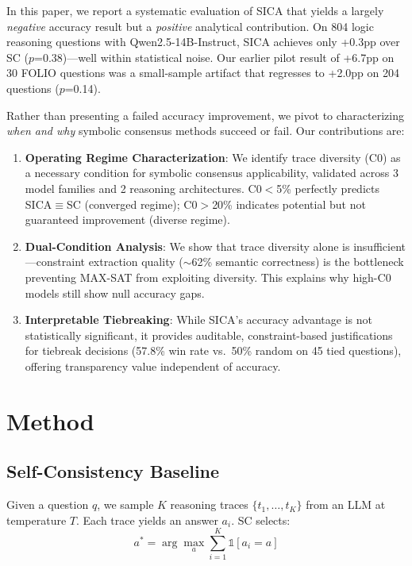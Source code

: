 \documentclass[11pt,a4paper]{article}
\begin{document}
In this paper, we report a systematic evaluation of SICA that yields a largely \emph{negative} accuracy result but a \emph{positive} analytical contribution. On 804 logic reasoning questions with Qwen2.5-14B-Instruct, SICA achieves only +0.3pp over SC ($p$=0.38)---well within statistical noise. Our earlier pilot result of +6.7pp on 30 FOLIO questions was a small-sample artifact that regresses to +2.0pp on 204 questions ($p$=0.14).

Rather than presenting a failed accuracy improvement, we pivot to characterizing \emph{when and why} symbolic consensus methods succeed or fail. Our contributions are:

\begin{enumerate}
\item \textbf{Operating Regime Characterization}: We identify trace diversity (C0) as a necessary condition for symbolic consensus applicability, validated across 3 model families and 2 reasoning architectures. C0$<$5\% perfectly predicts SICA$\equiv$SC (converged regime); C0$>$20\% indicates potential but not guaranteed improvement (diverse regime).

\item \textbf{Dual-Condition Analysis}: We show that trace diversity alone is insufficient---constraint extraction quality ($\sim$62\% semantic correctness) is the bottleneck preventing MAX-SAT from exploiting diversity. This explains why high-C0 models still show null accuracy gaps.

\item \textbf{Interpretable Tiebreaking}: While SICA's accuracy advantage is not statistically significant, it provides auditable, constraint-based justifications for tiebreak decisions (57.8\% win rate vs.\ 50\% random on 45 tied questions), offering transparency value independent of accuracy.
\end{enumerate}

\section{Method}

\subsection{Self-Consistency Baseline}

Given a question $q$, we sample $K$ reasoning traces $\{t_1, \ldots, t_K\}$ from an LLM at temperature $T$. Each trace yields an answer $a_i$. SC selects:
\begin{equation}
a^* = \arg\max_{a} \sum_{i=1}^K \mathbb{1}[a_i = a]
\end{equation}
\end{document}
